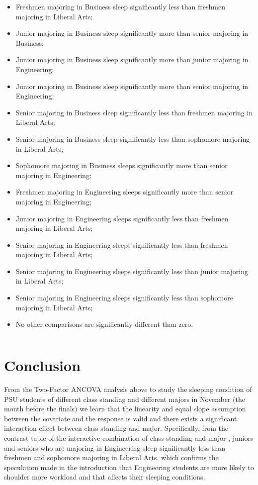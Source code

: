 \documentclass{article} %
\begin{document}
\begin{itemize}
\item  Freshmen majoring in Business sleep significantly less than freshmen majoring in Liberal Arts;
\item  Junior majoring in Business sleep significantly more than senior majoring in Business;
\item  Junior majoring in Business sleep significantly more than junior majoring in Engineering;
\item  Junior majoring in Business sleep significantly more than senior majoring in Engineering;
\item  Senior majoring in Business sleep significantly less than freshmen majoring in Liberal Arts;
\item  Senior majoring in Business sleep significantly less than sophomore majoring in Liberal Arts;
\item  Sophomore majoring in Business sleeps significantly more than senior majoring in Engineering;
\item  Freshmen majoring in Engineering sleeps significantly more than senior majoring in Engineering;
\item  Junior majoring in Engineering sleeps significantly less than freshmen majoring in Liberal Arts;
\item  Senior majoring in Engineering sleeps significantly less than freshmen majoring in Liberal Arts;
\item  Senior majoring in Engineering sleeps significantly less than junior majoring in Liberal Arts;
\item  Senior majoring in Engineering sleeps significantly less than sophomore majoring in Liberal Arts;
\item  No other comparisons are significantly different than zero.
\end{itemize}
\[\]

\section{Conclusion}


From the Two-Factor ANCOVA analysis above to study the sleeping condition of PSU students of different class standing and different majors in November (the month before the finals) we learn that the linearity and equal slope assumption between the covariate and the response is valid and there exists a significant interaction effect between class standing and major. Specifically, from the contrast table of the interactive combination of class standing and major , juniors and seniors who are majoring in Engineering sleep significantly less than freshmen and sophomore majoring in Liberal Arts, which confirms the speculation made in the introduction that Engineering students are more likely to shoulder more workload and that affects their sleeping conditions. 
\end{document}
